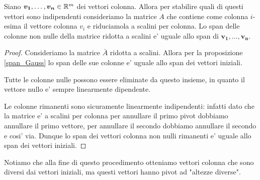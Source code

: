 \begin{proposition} \label{span_colonne_indipendenti}
    Siano $\bm{v_1}, \dots, \bm{v_n} \in \mathbb{R}^m$ dei vettori colonna. Allora per stabilire quali di questi vettori sono indipendenti consideriamo la matrice $A$ che contiene come colonna $i$-esima il vettore colonna $v_i$ e riduciamola a scalini per colonna. Lo span delle colonne non nulle della matrice ridotta a scalini e' uguale allo span di $\bm{v_1}, \dots, \bm{v_n}$.
\end{proposition}
\begin{proof} 
    Consideriamo la matrice $\bar{A}$ ridotta a scalini. Allora per la proposizione \ref{span_Gauss} lo span delle sue colonne e' uguale allo span dei vettori iniziali. 

    Tutte le colonne nulle possono essere eliminate da questo insieme, in quanto il vettore nullo e' sempre linearmente dipendente.

    Le colonne rimanenti sono sicuramente linearmente indipendenti: infatti dato che la matrice e' a scalini per colonna per annullare il primo pivot dobbiamo annullare il primo vettore, per annullare il secondo dobbiamo annullare il secondo e cosi' via. Dunque lo span dei vettori colonna non nulli rimanenti e' uguale allo span dei vettori iniziali.
\end{proof}

Notiamo che alla fine di questo procedimento otteniamo vettori colonna che sono diversi dai vettori iniziali, ma questi vettori hanno pivot ad "altezze diverse".

